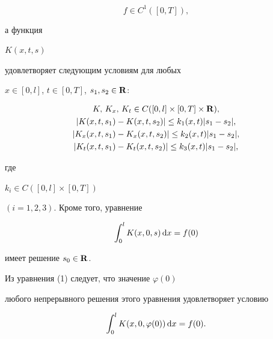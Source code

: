 \begin{equation}


f\in C^1([0,T]),




\end{equation}


а функция


$K(x,t,s)$


удовлетворяет следующим условиям для любых


$x\in [ 0,l]$, $t\in [0,T]$, $s_1,s_2\in {\bold R}$:


\begin{gather}


K,\,K_x,\,K_t\in C([ 0,l] \times [ 0,T] \times \rsp),




\\


| K(x,t,s_1)-K(x,t,s_2)| \leq k_1(x,t)| s_1-s_2|,




\\


| K_x(x,t,s_1)-K_x(x,t,s_2)| \leq k_2(x,t)| s_1-s_2|,




\\


| K_t( x,t,s_1) -K_t(x,t,s_2)| \leq k_3(x,t)| s_1-s_2|,




\end{gather}


где


$k_i\in C([0,l]\times [0,T])$


$(i=1,2,3)$. Кроме того, уравнение


\begin{equation}


\int_0^l K(x,0,s)\d x=f(0)




\end{equation}


имеет решение $s_0\in {\bold R}$.





\begin{notenonum}


Из уравнения (1) следует, что значение $\varphi(0)$


любого непрерывного решения этого уравнения удовлетворяет условию


\begin{equation}


\int_0^lK(x,0,\varphi (0))\d x=f(0).




\end{equation}


\end{notenonum}





